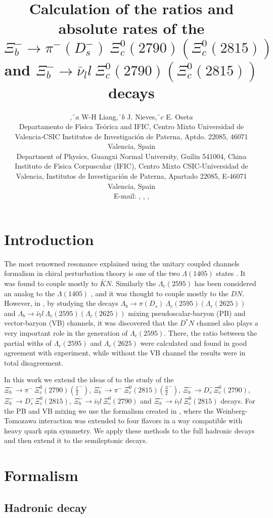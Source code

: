 \documentclass{PoS}
\title{Calculation of the ratios and absolute rates of the $\Xi_b^- \to \pi^- (D_s^- ) \ \Xi_c^0 (2790) \left(\Xi_c^0 (2815) \right)$ and $\Xi_b^- \to \bar{\nu}_l l \ \Xi_c^0 (2790) \left(\Xi_c^0 (2815) \right)$ decays}
\author{\speaker{R. Pavao},$ˆa$ W-H Liang,$ˆb$ J. Nieves,$ˆc$ E. Oset$a$\\
\llap{$ˆa$} Departamento de
F\'{\i}sica Te\'orica and IFIC, Centro Mixto Universidad de
Valencia-CSIC Institutos de Investigaci\'on de Paterna, Aptdo.
22085, 46071 Valencia, Spain\\
\llap{$ˆb$} Department of Physics, Guangxi Normal University,
Guilin 541004, China\\
\llap{$ˆc$} Instituto de F\'\i sica Corpuscular (IFIC), Centro Mixto
CSIC-Universidad de Valencia, Institutos de Investigaci\'on de
Paterna, Apartado 22085, E-46071 Valencia, Spain \\ 
E-mail: \email{rpavao@ific.uv.es}, \email{liangwh@gxnu.edu.cn},
\email{jmnieves@ific.uv.es}, \email{oset@ific.uv.es}}
\begin{document}
\section{Introduction}

The most renowned resonance explained using the unitary coupled channels formalism in chiral perturbation theory is one of the two $\Lambda(1405)$ states \cite{ollerulf,jido,ulfg2,carmen}. It was found to couple mostly to $\bar{K}N$. Similarly the $\Lambda_c(2595)$ has been considered an analog to the $\Lambda(1405)$ \cite{lutz,mizutani}, and it was thought to couple mostly to the $DN$. However, in \cite{weihong,weisemi}, by studying the decays  $\Lambda_b \to \pi (D_s ) \ \Lambda_c (2595) \left(\Lambda_c (2625) \right)$ and $\Lambda_b \to \bar{\nu}_l l \ \Lambda_c (2595) \left(\Lambda_c (2625) \right)$ mixing pseudoscalar-baryon (PB) and vector-baryon (VB) channels, it was discovered that the $D^* N$ channel also plays a very important role in the generation of $\Lambda_c (2595)$. There, the ratio between the partial withs of $\Lambda_c (2595)$ and $\Lambda_c (2625)$ were calculated and found in good agreement with experiment, while without the VB channel the results were in total disagreement.

In this work we extend the ideas of \cite{weihong,weisemi} to the study of the $\Xi_b^- \rightarrow \pi^- \ \Xi_c^0 (2790) (\frac{1}{2}^-)$, $\Xi_b^- \rightarrow \pi^- \ \Xi_c^0 (2815) (\frac{3}{2}^-)$, $\Xi_b^- \rightarrow D_s^- \Xi_c^0 (2790)$, $\Xi_b^- \rightarrow D_s^- \Xi_c^0 (2815)$, $\Xi_b^- \rightarrow \bar{\nu}_l l \ \Xi_c^0 (2790)$ and  $\Xi_b^- \rightarrow \bar{\nu}_l l \ \Xi_c^0 (2815)$ decays. For the PB and VB mixing we use the formalism created in \cite{romanets}, where the Weinberg-Tomozawa interaction was extended to four flavors in a way compatible with heavy quark spin symmetry. We apply these methods to the full hadronic decays and then extend it to the semileptonic decays.

\section{Formalism}
 
\subsection{Hadronic decay}

\end{document}

